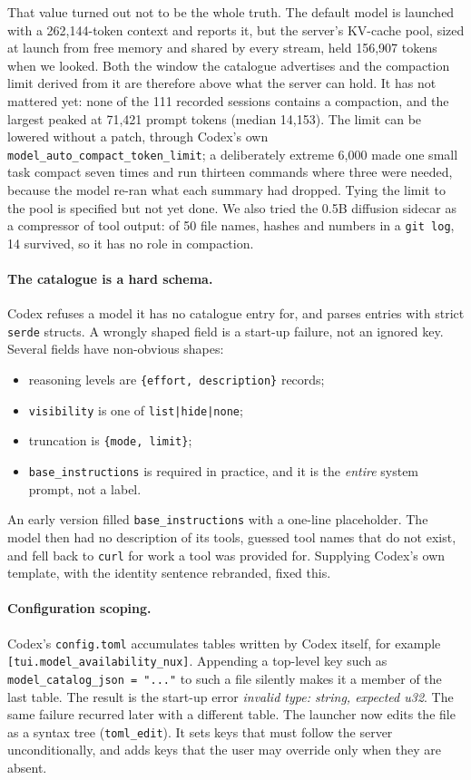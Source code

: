 \documentclass[11pt]{article}
\newcommand{\code}[1]{\texttt{#1}}
\begin{document}
That value turned out not to be the whole truth. The default model is launched with a 262{,}144-token
context and reports it, but the server's KV-cache pool, sized at launch from free memory and shared
by every stream, held 156{,}907 tokens when we looked. Both the window the catalogue advertises and
the compaction limit derived from it are therefore above what the server can hold. It has not
mattered yet: none of the 111 recorded sessions contains a compaction, and the largest peaked at
71{,}421 prompt tokens (median 14{,}153). The limit can be lowered without a patch, through Codex's
own \code{model\_auto\_compact\_token\_limit}; a deliberately extreme 6{,}000 made one small task
compact seven times and run thirteen commands where three were needed, because the model re-ran
what each summary had dropped. Tying the limit to the pool is specified but not yet done. We also
tried the 0.5B diffusion sidecar as a compressor of tool output: of 50 file names, hashes and
numbers in a \code{git log}, 14 survived, so it has no role in compaction.

\paragraph{The catalogue is a hard schema.} Codex refuses a model it has no catalogue entry for, and
parses entries with strict \code{serde} structs. A wrongly shaped field is a start-up failure, not
an ignored key. Several fields have non-obvious shapes:
\begin{itemize}
  \item reasoning levels are \code{\{effort, description\}} records;
  \item \code{visibility} is one of \code{list|hide|none};
  \item truncation is \code{\{mode, limit\}};
  \item \code{base\_instructions} is required in practice, and it is the \emph{entire} system prompt,
    not a label.
\end{itemize}
An early version filled \code{base\_instructions} with a one-line placeholder. The model then had no
description of its tools, guessed tool names that do not exist, and fell back to \code{curl} for
work a tool was provided for. Supplying Codex's own template, with the identity sentence rebranded,
fixed this.

\paragraph{Configuration scoping.} Codex's \code{config.toml} accumulates tables written by Codex
itself, for example \code{[tui.model\_availability\_nux]}. Appending a top-level key such as
\code{model\_catalog\_json = "..."} to such a file silently makes it a member of the last table. The
result is the start-up error \emph{invalid type: string, expected u32}. The same failure recurred
later with a different table. The launcher now edits the file as a syntax tree
(\code{toml\_edit}). It sets keys that must follow the server unconditionally, and adds keys that
the user may override only when they are absent.
\end{document}
